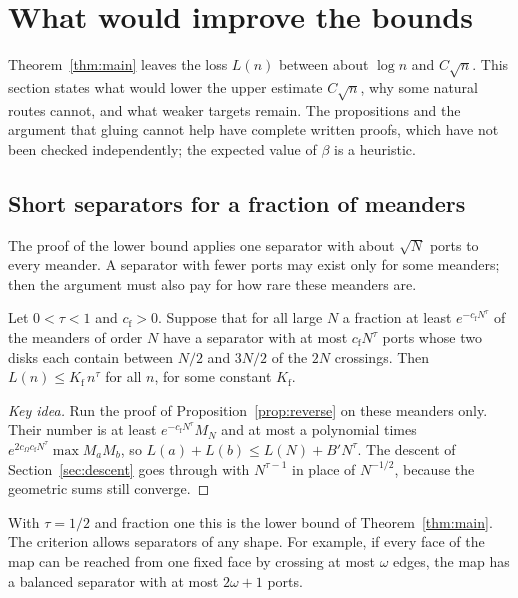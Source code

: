 \section{What would improve the bounds}\label{sec:improve}

Theorem~\ref{thm:main} leaves the loss $L(n)$ between about $\log n$ and $C\sqrt n$. This section
states what would lower the upper estimate $C\sqrt n$, why some natural routes cannot, and what
weaker targets remain. The propositions and the argument that gluing cannot help have complete
written proofs, which have not been checked independently; the expected value of $\beta$ is a
heuristic.

\subsection{Short separators for a fraction of meanders}

The proof of the lower bound applies one separator with about $\sqrt N$ ports to every meander. A
separator with fewer ports may exist only for some meanders; then the argument must also pay for how
rare these meanders are.

\begin{proposition}\label{prop:fraction}
Let $0<\tau<1$ and $c_{\mathrm f}>0$. Suppose that for all large $N$ a fraction at least
$e^{-c_{\mathrm f}N^\tau}$ of the meanders of order $N$ have a separator with at most
$c_{\mathrm f}N^\tau$ ports whose two disks each contain between $N/2$ and $3N/2$ of the $2N$
crossings. Then $L(n)\le K_{\mathrm f}\,n^\tau$ for all $n$, for some constant $K_{\mathrm f}$.
\end{proposition}

\begin{proof}[Key idea]
Run the proof of Proposition~\ref{prop:reverse} on these meanders only. Their number is at least
$e^{-c_{\mathrm f}N^\tau}M_N$ and at most a polynomial times $e^{2c_\Omega c_{\mathrm f}N^\tau}\max M_aM_b$,
so $L(a)+L(b)\le L(N)+B'N^\tau$. The descent of Section~\ref{sec:descent} goes through with
$N^{\tau-1}$ in place of $N^{-1/2}$, because the geometric sums still converge.
\end{proof}

With $\tau=1/2$ and fraction one this is the lower bound of Theorem~\ref{thm:main}. The criterion
allows separators of any shape. For example, if every face of the map can be reached from one fixed
face by crossing at most $\omega$ edges, the map has a balanced separator with at most $2\omega+1$ ports.

